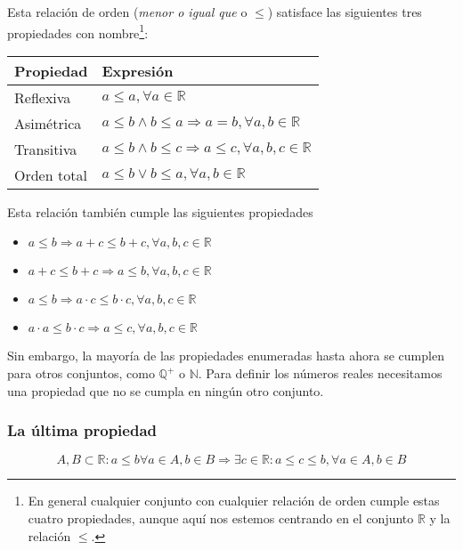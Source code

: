 Esta relación de orden (\textit{menor o igual que} o $\leq$) satisface las siguientes tres propiedades con nombre\footnote{%
	En general cualquier conjunto con cualquier relación de orden cumple estas cuatro propiedades, aunque aquí nos estemos centrando en el conjunto $\mathbb{R}$ y la relación $\leq$.
}:

\begin{center}
\begin{tabular}{l l}
	\textbf{Propiedad} & \textbf{Expresión}                                                          \\
	\toprule
	Reflexiva          & $a \leq a, \forall a \in\mathbb{R}$                                         \\
	Asimétrica         & $a \leq b \land b \leq a \Rightarrow a=b, \forall a,b \in\mathbb{R}$        \\
	Transitiva         & $a \leq b \land b \leq c \Rightarrow a \leq c, \forall a,b,c \in\mathbb{R}$ \\
	Orden total        & $a \leq b \lor b \leq a, \forall a,b \in\mathbb{R}$                         \\
\end{tabular}
\end{center}

Esta relación también cumple las siguientes propiedades

\begin{itemize}
	\item $a \leq b \Rightarrow a+c \leq b+c, \forall a,b,c \in\mathbb{R}$
	\item $a+c \leq b+c \Rightarrow a \leq b, \forall a,b,c \in\mathbb{R}$
	\item $a \leq b \Rightarrow a \cdot c \leq b \cdot c, \forall a,b,c \in\mathbb{R}$
	\item $a \cdot a \leq b \cdot c \Rightarrow a \leq c, \forall a,b,c \in\mathbb{R}$
\end{itemize}

Sin embargo, la mayoría de las propiedades enumeradas hasta ahora se cumplen para otros conjuntos, como $\mathbb{Q}^+$ o $\mathbb{N}$.
Para definir los números reales necesitamos una propiedad que no se cumpla en ningún otro conjunto.

\subsubsection{La última propiedad}

\[A,B \subset\mathbb{R} : a \leq b \forall a \in A, b \in B \Rightarrow \exists c \in\mathbb{R} : a \leq c \leq b, \forall a \in A, b \in B\]

